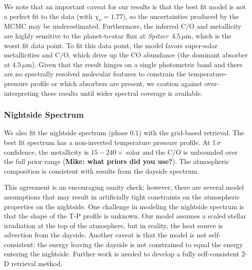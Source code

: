 \documentclass[twocolumn]{aastex61}
\newcommand{\project}[1]{\textsl{#1}}
\newcommand{\Spitzer}{\project{Spitzer}}
\begin{document}
We note that an important caveat for our results is that the best fit model is not a perfect fit to the data (with $\chi_\nu = 1.77$), so the uncertainties produced by the MCMC may be underestimated. Furthermore, the inferred C/O and metallicity are highly sensitive to the planet-to-star flux at \Spitzer\ $4.5\,\mu$m, which is the worst fit data point. To fit this data point, the model favors super-solar metallicities and C/O, which drive up the CO abundance (the dominant absorber at $4.5\,\mu$m). Given that the result hinges on a single photometric band and there are no spectrally resolved molecular features to constrain the temperature-pressure profile or which absorbers are present, we caution against over-interpreting these results until wider spectral coverage is available.


\subsubsection{Nightside Spectrum}
We also fit the nightside spectrum (phase $0.1$) with the grid-based retrieval. The best fit spectrum has a non-inverted temperature pressure profile.  At 1\,$\sigma$ confidence, the metallicity is $15 - 240\times$ solar and the C/O is unbounded over the full prior range (\textbf{Mike: what priors did you use?}). The atmospheric composition is consistent with results from the dayside spectrum. 

This agreement is an encouraging sanity check; however, there are several model assumptions that may result in artificially tight constraints on the atmospheric properties on the nightside.  One challenge in modeling the nightside spectrum is that the shape of the T-P profile is unknown.  Our model assumes a scaled stellar irradiation at the top of the atmosphere, but in reality, the heat source is advection from the dayside. Another caveat is that the model is not self-consistent: the energy leaving the dayside is not constrained to equal the energy entering the nightside.  Further work is needed to develop a fully self-consistent 2-D retrieval method. 
\end{document}
